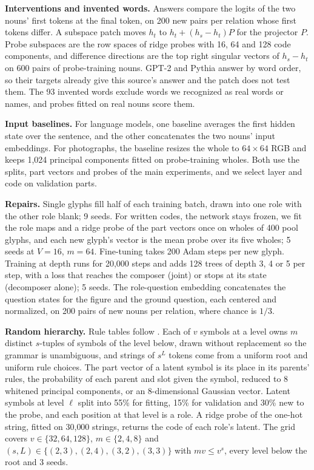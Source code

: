\documentclass[10pt]{article}
\theoremstyle{plain}
\theoremstyle{remark}
\begin{document}
\textbf{Interventions and invented words.} Answers compare the logits of the two nouns' first tokens at the final token, on 200 new pairs per relation whose first tokens differ. A subspace patch moves $h_t$ to $h_t + (h_s - h_t) P$ for the projector $P$. Probe subspaces are the row spaces of ridge probes with 16, 64 and 128 code components, and difference directions are the top right singular vectors of $h_s - h_t$ on 600 pairs of probe-training nouns. GPT-2 and Pythia answer by word order, so their targets already give this source's answer and the patch does not test them. The 93 invented words exclude words we recognized as real words or names, and probes fitted on real nouns score them.

\textbf{Input baselines.} For language models, one baseline averages the first hidden state over the sentence, and the other concatenates the two nouns' input embeddings. For photographs, the baseline resizes the whole to $64 \times 64$ RGB and keeps 1{,}024 principal components fitted on probe-training wholes. Both use the splits, part vectors and probes of the main experiments, and we select layer and code on validation parts.

\textbf{Repairs.} Single glyphs fill half of each training batch, drawn into one role with the other role blank; 9 seeds. For written codes, the network stays frozen, we fit the role maps and a ridge probe of the part vectors once on wholes of 400 pool glyphs, and each new glyph's vector is the mean probe over its five wholes; 5 seeds at $V = 16$, $m = 64$. Fine-tuning takes 200 Adam steps per new glyph. Training at depth runs for 20{,}000 steps and adds 128 trees of depth 3, 4 or 5 per step, with a loss that reaches the composer (joint) or stops at its state (decomposer alone); 5 seeds. The role-question embedding concatenates the question states for the figure and the ground question, each centered and normalized, on 200 pairs of new nouns per relation, where chance is $1/3$.

\textbf{Random hierarchy.} Rule tables follow \citet{cagnetta2024rhm}. Each of $v$ symbols at a level owns $m$ distinct $s$-tuples of symbols of the level below, drawn without replacement so the grammar is unambiguous, and strings of $s^L$ tokens come from a uniform root and uniform rule choices. The part vector of a latent symbol is its place in its parents' rules, the probability of each parent and slot given the symbol, reduced to 8 whitened principal components, or an 8-dimensional Gaussian vector. Latent symbols at level $\ell$ split into 55\% for fitting, 15\% for validation and 30\% new to the probe, and each position at that level is a role. A ridge probe of the one-hot string, fitted on 30{,}000 strings, returns the code of each role's latent. The grid covers $v \in \{32, 64, 128\}$, $m \in \{2, 4, 8\}$ and $(s, L) \in \{(2,3), (2,4), (3,2), (3,3)\}$ with $mv \le v^s$, every level below the root and 3 seeds.
\end{document}
